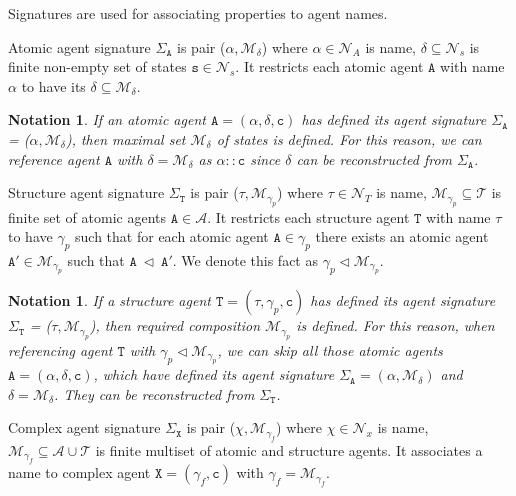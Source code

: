 \documentclass{entcs}
\renewcommand{\~}[0]{\texttildelow}
\newtheorem{notation}[thm]{Notation}
\begin{document}
Signatures are used for associating properties to agent names.

\begin{definition}
Atomic agent signature $\Sigma_\mathtt{A}$ is pair ($\alpha, \mathcal{M}_\delta$) where $\alpha \in \mathcal{N}_{A}$ is name, $\delta \subseteq \mathcal{N}_{s}$ is finite non-empty set of states $\mathtt{s} \in \mathcal{N}_{s}$. It restricts each atomic agent $\mathtt{A}$ with name $\alpha$ to have its $\delta \subseteq \mathcal{M}_\delta$. 
\end{definition}

\begin{notation}
If an atomic agent $\mathtt{A} = (\alpha, \delta, \mathtt{c})$ has defined its agent signature $\Sigma_\mathtt{A}$ = ($\alpha, \mathcal{M}_\delta$), then maximal set $\mathcal{M}_\delta$ of states is defined. For this reason, we can reference agent $\mathtt{A}$ with $\delta = \mathcal{M}_\delta$ as $\alpha::\mathtt{c}$ since $\delta$ can be reconstructed from $\Sigma_\mathtt{A}$.
\end{notation}

\begin{definition}
Structure agent signature $\Sigma_\mathtt{T}$ is pair ($\tau, \mathcal{M}_{\gamma_p}$) where $\tau \in \mathcal{N}_{T}$ is name, $\mathcal{M}_{\gamma_p} \subseteq \mathcal{T}$ is finite set of atomic agents $\mathtt{A} \in \mathcal{A}$. It restricts each structure agent $\mathtt{T}$ with name $\tau$ to have $\gamma_p$ such that for each atomic agent $\mathtt{A} \in \gamma_p$ there exists an atomic agent $\mathtt{A}' \in \mathcal{M}_{\gamma_p}$ such that $\mathtt{A}~\lhd~\mathtt{A}'$. We denote this fact as $\gamma_p \lhd \mathcal{M}_{\gamma_p}$.
\end{definition}

\begin{notation}
If a structure agent $\mathtt{T} = (\tau, \gamma_p, \mathtt{c})$ has defined its agent signature $\Sigma_\mathtt{T}$ = ($\tau, \mathcal{M}_{\gamma_p}$), then required composition $\mathcal{M}_{\gamma_p}$ is defined. For this reason, when referencing agent $\mathtt{T}$ with $\gamma_p \lhd \mathcal{M}_{\gamma_p}$, we can skip all those atomic agents $\mathtt{A} = (\alpha, \delta, \mathtt{c})$, which have defined its agent signature $\Sigma_\mathtt{A} = (\alpha, \mathcal{M}_\delta)$ and $\delta = \mathcal{M}_\delta$. They can be reconstructed from $\Sigma_\mathtt{T}$.
\end{notation}

\begin{definition}
Complex agent signature $\Sigma_\mathtt{X}$ is pair ($\chi, \mathcal{M}_{\gamma_f}$) where $\chi \in \mathcal{N}_{x}$ is name, $\mathcal{M}_{\gamma_f} \subseteq \mathcal{A} \cup \mathcal{T}$ is finite multiset of atomic and structure agents. It associates a name to complex agent $\mathtt{X} = (\gamma_f, \mathtt{c})$ with $\gamma_f = \mathcal{M}_{\gamma_f}$.
\end{definition}
\end{document}
